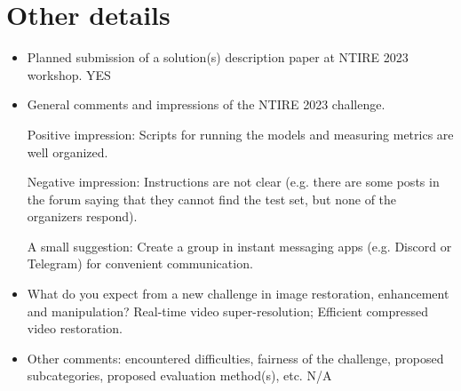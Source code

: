 \documentclass[10pt,twocolumn,letterpaper]{article}
\begin{document}
\section{Other details}
\begin{itemize}
\item Planned submission of a solution(s) description paper at NTIRE 2023 workshop. YES
\item General comments and impressions of the NTIRE 2023 challenge. 

Positive impression: Scripts for running the models and measuring metrics are well organized.

Negative impression: Instructions are not clear (e.g. there are some posts in the forum saying that they cannot find the test set, but none of the organizers respond).

A small suggestion: Create a group in instant messaging apps (e.g. Discord or Telegram) for convenient communication.

\item What do you expect from a new challenge in image restoration, enhancement and manipulation?
Real-time video super-resolution; Efficient compressed video restoration.
\item Other comments: encountered difficulties, fairness of the challenge, proposed subcategories, proposed evaluation method(s), etc. N/A
\end{itemize}

{\small


}
\end{document}

